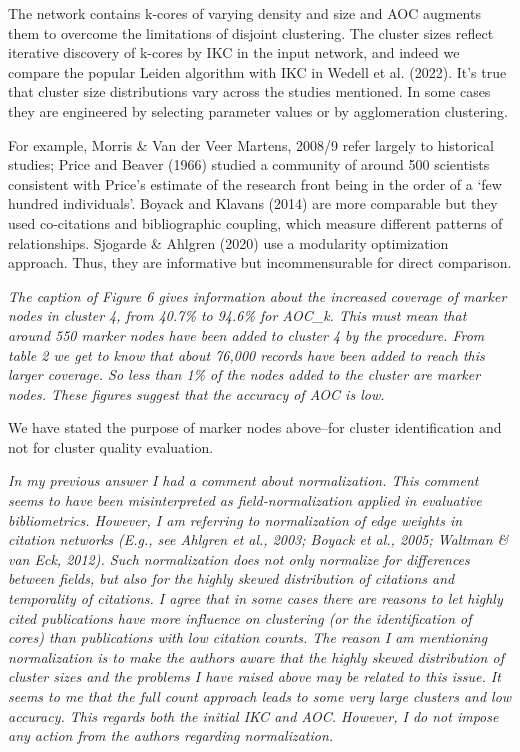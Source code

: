 \documentclass[11pt, oneside]{article}   	%
\begin{document}
\vspace{2 mm} 
The network contains k-cores of varying density and size and AOC augments them to overcome the limitations of disjoint clustering. The cluster sizes reflect iterative discovery of k-cores by IKC in the input network, and indeed we compare the popular Leiden algorithm with IKC in Wedell et al. (2022). It's true that cluster size distributions vary across the studies mentioned. In some cases they are engineered by selecting parameter values or by agglomeration clustering. 

 For example, Morris \& Van der Veer Martens, 2008/9 refer largely to historical studies; Price and Beaver (1966) studied a community of around 500 scientists consistent with Price's estimate of the research front being in the order of a `few hundred individuals'. Boyack and Klavans (2014) are more comparable but they used co-citations and bibliographic coupling, which measure different patterns of relationships. Sjogarde \& Ahlgren (2020) use a modularity optimization approach. Thus, they are informative but incommensurable for direct comparison.

\vspace{2 mm} 
 \emph{The caption of Figure 6 gives information about the increased coverage of marker nodes in cluster 4, from 40.7\% to 94.6\% for AOC\_k. This must mean that around 550 marker nodes have been added to cluster 4 by the procedure. From table 2 we get to know that about 76,000 records have been added to reach this larger coverage. So less than 1\% of the nodes added to the cluster are marker nodes. These figures suggest that the accuracy of AOC is low.}
\vspace{2 mm} 

\vspace{2 mm} 
We have stated the purpose of marker nodes above--for cluster identification and not for cluster quality evaluation.

\vspace{2 mm} 
 \emph{ In my previous answer I had a comment about normalization. This comment seems to have been misinterpreted as field-normalization applied in evaluative bibliometrics. However, I am referring to normalization of edge weights in citation networks (E.g., see Ahlgren et al., 2003; Boyack et al., 2005; Waltman \& van Eck, 2012). Such normalization does not only normalize for differences between fields, but also for the highly skewed distribution of citations and temporality of citations. I agree that in some cases there are reasons to let highly cited publications have more influence on clustering (or the identification of cores) than publications with low citation counts. The reason I am mentioning normalization is to make the authors aware that the highly skewed distribution of cluster sizes and the problems I have raised above may be related to this issue. It seems to me that the full count approach leads to some very large clusters and low accuracy. This regards both the initial IKC and AOC. However, I do not impose any action from the authors regarding normalization.}
 
\end{document}
